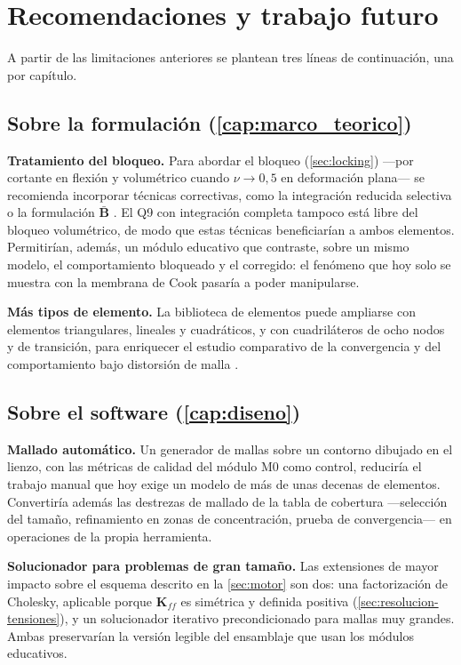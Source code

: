 \section*{Recomendaciones y trabajo futuro}

A partir de las limitaciones anteriores se plantean tres líneas de continuación, una por capítulo.

\subsection*{Sobre la formulación (\autoref{cap:marco_teorico})}

\textbf{Tratamiento del bloqueo.} Para abordar el bloqueo (\autoref{sec:locking}) —por cortante en flexión y volumétrico cuando $\nu \to 0{,}5$ en deformación plana— se recomienda incorporar técnicas correctivas, como la integración reducida selectiva o la formulación $\bar{\bm{B}}$ \autocite{hughes2000fem,bathe2014fem}. El Q9 con integración completa tampoco está libre del bloqueo volumétrico, de modo que estas técnicas beneficiarían a ambos elementos. Permitirían, además, un módulo educativo que contraste, sobre un mismo modelo, el comportamiento bloqueado y el corregido: el fenómeno que hoy solo se muestra con la membrana de Cook pasaría a poder manipularse.

\textbf{Más tipos de elemento.} La biblioteca de elementos puede ampliarse con elementos triangulares, lineales y cuadráticos, y con cuadriláteros de ocho nodos y de transición, para enriquecer el estudio comparativo de la convergencia y del comportamiento bajo distorsión de malla \autocite{onate2009structural,reddy2006introduction}.

\subsection*{Sobre el software (\autoref{cap:diseno})}

\textbf{Mallado automático.} Un generador de mallas sobre un contorno dibujado en el lienzo, con las métricas de calidad del módulo M0 como control, reduciría el trabajo manual que hoy exige un modelo de más de unas decenas de elementos. Convertiría además las destrezas de mallado de la tabla de cobertura —selección del tamaño, refinamiento en zonas de concentración, prueba de convergencia— en operaciones de la propia herramienta.

\textbf{Solucionador para problemas de gran tamaño.} Las extensiones de mayor impacto sobre el esquema descrito en la \autoref{sec:motor} son dos: una factorización de Cholesky, aplicable porque $\bm{K}_{ff}$ es simétrica y definida positiva (\autoref{sec:resolucion-tensiones}), y un solucionador iterativo precondicionado para mallas muy grandes. Ambas preservarían la versión legible del ensamblaje que usan los módulos educativos.

